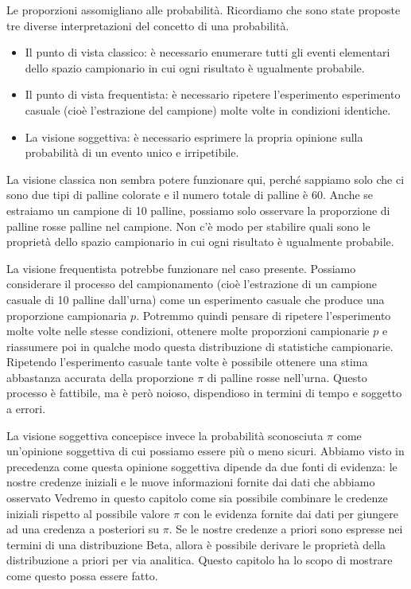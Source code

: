 \documentclass[
  10pt,
  italian,
  a4paper,
  extrafontsizes,onecolumn,openright
  ]{memoir}
\theoremstyle{definition}
\theoremstyle{definition}
\theoremstyle{definition}
\theoremstyle{definition}
\theoremstyle{remark}
\begin{document}
Le proporzioni assomigliano alle probabilità. Ricordiamo che sono state proposte tre diverse interpretazioni del concetto di una probabilità.

\begin{itemize}
\item
  Il punto di vista classico: è necessario enumerare tutti gli eventi elementari dello spazio campionario in cui ogni risultato è ugualmente probabile.
\item
  Il punto di vista frequentista: è necessario ripetere l'esperimento esperimento casuale (cioè l'estrazione del campione) molte volte in condizioni identiche.
\item
  La visione soggettiva: è necessario esprimere la propria opinione sulla probabilità di un evento unico e irripetibile.
\end{itemize}

La visione classica non sembra potere funzionare qui, perché sappiamo solo che ci sono due tipi di palline colorate e il numero totale di palline è 60. Anche se estraiamo un campione di 10 palline, possiamo solo osservare la proporzione di palline rosse palline nel campione. Non c'è modo per stabilire quali sono le proprietà dello spazio campionario in cui ogni risultato è ugualmente probabile.

La visione frequentista potrebbe funzionare nel caso presente. Possiamo considerare il processo del campionamento (cioè l'estrazione di un campione casuale di 10 palline dall'urna) come un esperimento casuale che produce una proporzione campionaria \(p\). Potremmo quindi pensare di ripetere l'esperimento molte volte nelle stesse condizioni, ottenere molte proporzioni campionarie \(p\) e riassumere poi in qualche modo questa distribuzione di statistiche campionarie. Ripetendo l'esperimento casuale tante volte è possibile ottenere una stima abbastanza accurata della proporzione \(\pi\) di palline rosse nell'urna. Questo processo è fattibile, ma è però noioso, dispendioso in termini di tempo e soggetto a errori.

La visione soggettiva concepisce invece la probabilità sconosciuta \(\pi\) come un'opinione soggettiva di cui possiamo essere più o meno sicuri. Abbiamo visto in precedenza come questa opinione soggettiva dipende da due fonti di evidenza: le nostre credenze iniziali e le nuove informazioni fornite dai dati che abbiamo osservato Vedremo in questo capitolo come sia possibile combinare le credenze iniziali rispetto al possibile valore \(\pi\) con le evidenza fornite dai dati per giungere ad una credenza a posteriori su \(\pi\). Se le nostre credenze a priori sono espresse nei termini di una distribuzione Beta, allora è possibile derivare le proprietà della distribuzione a priori per via analitica. Questo capitolo ha lo scopo di mostrare come questo possa essere fatto.
\end{document}
